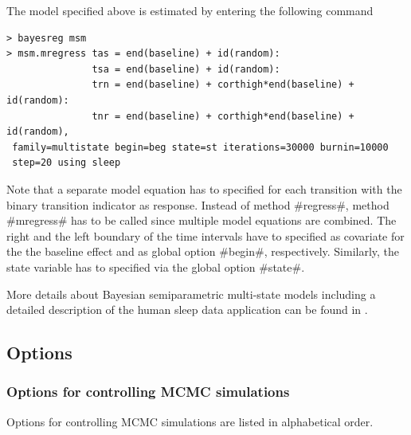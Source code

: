 The model specified above is estimated by entering the following
command

\begin{verbatim}
> bayesreg msm
> msm.mregress tas = end(baseline) + id(random):
               tsa = end(baseline) + id(random):
               trn = end(baseline) + corthigh*end(baseline) + id(random):
               tnr = end(baseline) + corthigh*end(baseline) + id(random),
 family=multistate begin=beg state=st iterations=30000 burnin=10000
 step=20 using sleep
\end{verbatim}

Note that a separate model equation has to specified for each
transition with the binary transition indicator as response.
Instead of method #regress#, method #mregress# has to be called
since multiple model equations are combined. The right and the
left boundary of the time intervals have to specified as covariate
for the the baseline effect and as global option #begin#,
respectively. Similarly, the state variable has to specified via
the global option #state#.

More details about Bayesian semiparametric multi-state models
including a detailed description of the human sleep data application
can be found in .

\subsection{Options}
\label{regressoptions}

\vspace{0.4cm}

\subsubsection*{Options for controlling MCMC simulations}
\label{mcmc_options}

Options for controlling MCMC simulations are listed in
alphabetical order.


